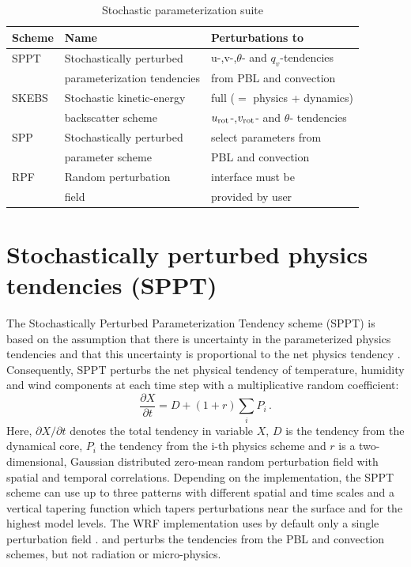 \begin{table}[h!]
\begin{center}
\caption{Stochastic parameterization suite}
\begin{tabular}{ | l | l | l |}
\hline
Scheme          & Name & Perturbations to \\ 
\hline
SPPT  & Stochastically perturbed    &  u-,v-,$\theta$- and $q_v$-tendencies\\
      & parameterization tendencies &  from PBL and convection\\
SKEBS & Stochastic kinetic-energy   &  full ($=$ physics + dynamics) \\
      & backscatter scheme          &  $u_{\rm rot}$-,$v_{\rm rot}$- and $\theta$- tendencies\\ 
SPP & Stochastically perturbed      &  select parameters from\\
    & parameter scheme              &  PBL and convection \\
RPF & Random perturbation           &  interface must be \\
    & field                         &  provided by user\\
\hline
\end{tabular}
\end{center}
\label{stoch_table}
\end{table}

\section {Stochastically perturbed physics tendencies (SPPT)}
The Stochastically Perturbed Parameterization Tendency scheme
(SPPT) is based on the assumption that there is uncertainty
in the parameterized physics tendencies and that this 
uncertainty is proportional to the net physics tendency \citep{Bu99,Pa09}.
Consequently, SPPT perturbs the net physical tendency of temperature, 
humidity and wind components at each time step with a multiplicative 
random coefficient:
\begin{equation}
   \frac{\partial X}{\partial t}= D + (1+ r) \sum_i P_i \,.
\end{equation}
Here, ${\partial X}/{\partial t}$ denotes the total tendency in variable $X$, 
$D$ is the tendency from the dynamical core, 
$P_i$ the tendency from the i-th physics scheme 
and $r$ is a two-dimensional, Gaussian distributed zero-mean random
perturbation field with spatial and temporal correlations. 
Depending on
the implementation, the SPPT scheme can use up to three patterns with
different spatial and time scales and a vertical tapering function which 
tapers perturbations near the surface and for the highest model levels.
The WRF implementation uses by default only a single perturbation field \citep{Be15}.
and perturbs the tendencies from the PBL and convection schemes, but not radiation
or micro-physics.

